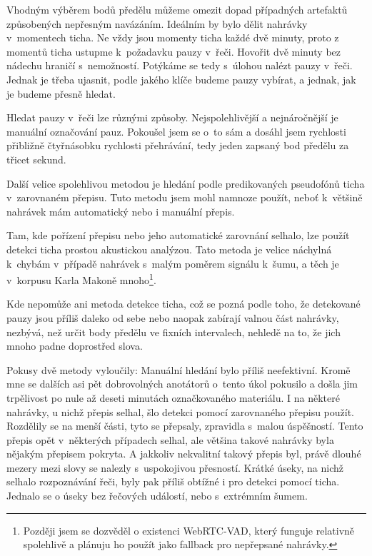 Vhodným výběrem bodů předělu můžeme omezit dopad případných artefaktů
způsobených nepřesným navázáním. Ideálním by bylo dělit nahrávky v~momentech
ticha. Ne vždy jsou momenty ticha každé dvě minuty, proto z momentů ticha
ustupme k~požadavku pauzy v~řeči. Hovořit dvě minuty bez nádechu hraničí
s~nemožností. Potýkáme se tedy s~úlohou nalézt pauzy v~řeči. Jednak je třeba
ujasnit, podle jakého klíče budeme pauzy vybírat, a jednak, jak je budeme přesně
hledat.

Hledat pauzy v~řeči lze různými způsoby. Nejspolehlivější a nejnáročnější je
manuální označování pauz. Pokoušel jsem se o~to sám a dosáhl jsem rychlosti
přibližně čtyřnásobku rychlosti přehrávání, tedy jeden zapsaný bod předělu za
třicet sekund.

Další velice spolehlivou metodou je hledání podle predikovaných pseudofónů
ticha v~zarovnaném přepisu. Tuto metodu jsem mohl namnoze použít, neboť
k~většině nahrávek mám automatický nebo i manuální přepis.

Tam, kde pořízení přepisu nebo jeho automatické zarovnání selhalo, lze použít
detekci ticha prostou akustickou analýzou. Tato metoda je velice náchylná
k~chybám v~případě nahrávek s~malým poměrem signálu k~šumu, a těch je v~korpusu
Karla Makoně mnoho\footnote{Později jsem se dozvěděl o existenci WebRTC-VAD,
který funguje relativně spolehlivě a plánuju ho použít jako fallback pro
nepřepsané nahrávky.}.

Kde nepomůže ani metoda detekce ticha, což se pozná podle toho, že detekované
pauzy jsou příliš daleko od sebe nebo naopak zabírají valnou část nahrávky,
nezbývá, než určit body předělu ve fixních intervalech, nehledě na to, že jich
mnoho padne doprostřed slova.

Pokusy dvě metody vyloučily: Manuální hledání bylo příliš neefektivní. Kromě mne
se dalších asi pět dobrovolných anotátorů o~tento úkol pokusilo a došla jim
trpělivost po nule až deseti minutách označkovaného materiálu. I na některé
nahrávky, u nichž přepis selhal, šlo detekci pomocí
zarovnaného přepisu použít.
Rozdělily se na menší části, tyto se přepsaly, zpravidla
s~malou úspěšností. Tento přepis opět v~některých případech selhal, ale
většina takové nahrávky byla nějakým přepisem pokryta. A jakkoliv nekvalitní
takový přepis byl, právě dlouhé mezery mezi slovy se nalezly s~uspokojivou
přesností. Krátké úseky, na nichž selhalo rozpoznávání řeči, byly pak příliš
obtížné i pro detekci pomocí ticha. Jednalo se o úseky bez řečových událostí,
nebo s~extrémním šumem.


